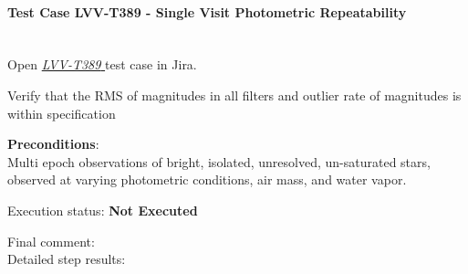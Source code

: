 \documentclass[DM,lsstdraft,STR,toc]{lsstdoc}
\begin{document}
    \paragraph{Test Case LVV-T389 - Single Visit Photometric Repeatability
 }\mbox{}\\

Open  \href{https://jira.lsstcorp.org/secure/Tests.jspa#/testCase/LVV-T389}{\textit{ LVV-T389 } }
test case in Jira.

    Verify that the RMS of magnitudes in all filters and outlier rate of
magnitudes is within specification


    \textbf{ Preconditions}:\\
    Multi epoch observations of bright, isolated, unresolved, un-saturated
stars, observed at varying photometric conditions, air mass, and water
vapor.


    Execution status: {\bf Not Executed }

    Final comment:\\


    Detailed step results:
\end{document}
